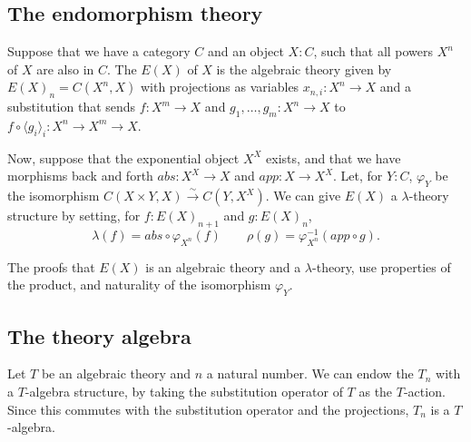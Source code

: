 \subsection{The endomorphism theory}

\begin{definition}\label{def:endomorphism-theory}
  Suppose that we have a category $ C $ and an object $ X: C $, such that all powers $ X^n $ of $ X $ are also in $ C $.
  The  $ E(X) $ of $ X $ is the algebraic theory given by $ E(X)_n = C(X^n, X) $ with projections as variables $ x_{n, i}: X^n \to X $ and a substitution that sends $ f: X^m \to X $ and $ g_1, \dots, g_m: X^n \to X $ to $ f \circ \langle g_i \rangle_i: X^n \to X^m \to X $.
\end{definition}

\begin{definition}
  Now, suppose that the exponential object $ X^X $ exists, and that we have morphisms back and forth $ abs: X^X \to X $ and $ app: X \to X^X $. Let, for $ Y: C $, $ \varphi_Y $ be the isomorphism $ C(X \times Y, X) \xrightarrow{\sim} C(Y, X^X) $.
  We can give $ E(X) $ a $ \lambda $-theory structure by setting, for $ f: E(X)_{n + 1} $ and $ g: E(X)_n $,
  \[ \lambda(f) = abs \circ \varphi_{X^n}(f) \qquad \rho(g) = \varphi_{X^n}^{-1}(app \circ g). \]
\end{definition}

The proofs that $ E(X) $ is an algebraic theory and a $ \lambda $-theory, use properties of the product, and naturality of the isomorphism $ \varphi_Y $.

\subsection{The theory algebra}
\begin{example}\label{ex:theory-algebra}
  Let $ T $ be an algebraic theory and $ n $ a natural number. We can endow the $ T_n $ with a $ T $-algebra structure, by taking the substitution operator of $ T $ as the $ T $-action. Since this commutes with the substitution operator and the projections, $ T_n $ is a $ T $-algebra.
\end{example}

